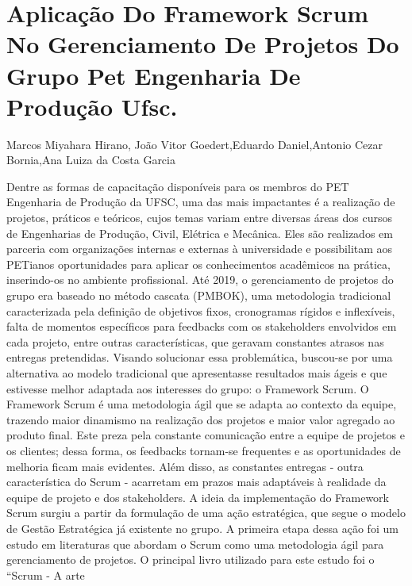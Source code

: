


\section*{Aplicação Do Framework Scrum No Gerenciamento De Projetos Do Grupo Pet Engenharia De Produção Ufsc.}

Marcos Miyahara Hirano, João Vitor Goedert,Eduardo Daniel,Antonio Cezar Bornia,Ana Luiza da Costa Garcia

Dentre as formas de capacitação disponíveis para os membros do PET Engenharia de 
Produção da UFSC, uma das mais impactantes é a realização de projetos, práticos e teóricos, cujos 
temas variam entre diversas áreas dos cursos de Engenharias de Produção, Civil, Elétrica e 
Mecânica. Eles são realizados em parceria com organizações internas e externas à universidade e 
possibilitam aos PETianos oportunidades para aplicar os conhecimentos acadêmicos na prática, 
inserindo-os no ambiente profissional.
Até 2019, o gerenciamento de projetos do grupo era baseado no método cascata (PMBOK), 
uma metodologia tradicional caracterizada pela definição de objetivos fixos, cronogramas rígidos 
e inflexíveis, falta de momentos específicos para feedbacks com os stakeholders envolvidos em 
cada projeto, entre outras características, que geravam constantes atrasos nas entregas pretendidas. 
Visando solucionar essa problemática, buscou-se por uma alternativa ao modelo tradicional que 
apresentasse resultados mais ágeis e que estivesse melhor adaptada aos interesses do grupo: o
Framework Scrum.
O Framework Scrum é uma metodologia ágil que se adapta ao contexto da equipe, trazendo 
maior dinamismo na realização dos projetos e maior valor agregado ao produto final. Este preza 
pela constante comunicação entre a equipe de projetos e os clientes; dessa forma, os feedbacks 
tornam-se frequentes e as oportunidades de melhoria ficam mais evidentes. Além disso, as 
constantes entregas - outra característica do Scrum - acarretam em prazos mais adaptáveis à 
realidade da equipe de projeto e dos stakeholders.
A ideia da implementação do Framework Scrum surgiu a partir da formulação de 
uma ação estratégica, que segue o modelo de Gestão Estratégica já existente no grupo. A primeira 
etapa dessa ação foi um estudo em literaturas que abordam o Scrum como uma metodologia ágil 
para gerenciamento de projetos. O principal livro utilizado para este estudo foi o “Scrum - A arte 
